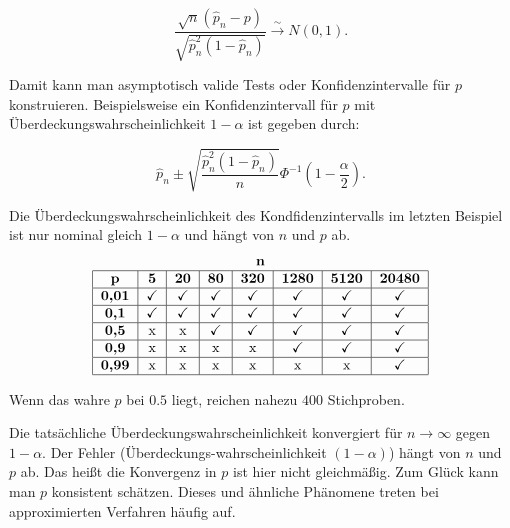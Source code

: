 \documentclass[10pt]{article}
\newcommand{\KV}{\overset{\sim} \longrightarrow} %
\newenvironment{BSP}[1][]
{\begin{Beispiel}[frametitle=#1]}{\end{Beispiel}}
\begin{document}
\begin{BSP}[Beispiel 1.3.6 (Delta-Methode)]
		\begin{equation*}
			\frac{\sqrt{n}(\hat{p}_n-p)}{\sqrt{\hat{p}_n^2(1-\hat{p}_n)}} \KV N(0,1).
		\end{equation*}
		
		Damit kann man asymptotisch valide Tests oder Konfidenzintervalle für $p$ konstruieren. Beispielsweise ein Konfidenzintervall für $p$ mit Überdeckungswahrscheinlichkeit $1-\alpha$ ist gegeben durch:
		
		\begin{equation*}
			\hat{p}_n \pm \sqrt{\frac{\hat{p}_n^2 (1-\hat{p}_n)}{n}} \Phi^{-1} \left(1-\frac{\alpha}{2}\right).
		\end{equation*}
		
	\end{BSP}
	
	\noindent Die Überdeckungswahrscheinlichkeit des Kondfidenzintervalls im letzten Beispiel ist nur nominal gleich $1-\alpha$ und hängt von $n$ und $p$ ab. 
	\begin{align*}
		\begin{tabular}{|c|c|c|c|c|c|c|c|}
			\multicolumn{8}{c}{$\textbf{n}$}\\
			\hline
			\textbf{p} & \textbf{5} & \textbf{20} & \textbf{80} & \textbf{320} & \textbf{1280} & \textbf{5120} & \textbf{20480}\\
			\hline
			\textbf{0,01} & \checkmark & \checkmark & \checkmark & \checkmark & \checkmark & \checkmark & \checkmark \\
			\hline
			\textbf{0,1} & \checkmark & \checkmark & \checkmark & \checkmark & \checkmark & \checkmark & \checkmark\\
			\hline
			\textbf{0,5} & x & x & \checkmark & \checkmark & \checkmark & \checkmark & \checkmark\\
			\hline
			\textbf{0,9} &x &x &x &x & \checkmark& \checkmark& \checkmark\\
			\hline
			\textbf{0,99} &x &x &x &x &x &x & \checkmark \\
			\hline
		\end{tabular}
	\end{align*}
	
	
	
	\noindent Wenn das wahre $p$ bei $0.5$ liegt, reichen nahezu $400$ Stichproben. 
	
	Die tatsächliche Überdeckungswahrscheinlichkeit konvergiert für  $n \rightarrow \infty$ gegen $1-\alpha$. Der Fehler (Überdeckungs-wahrscheinlichkeit $(1-\alpha)$) hängt von $n$ und $p$ ab. Das heißt die Konvergenz in $p$ ist hier nicht gleichmäßig. Zum Glück kann man $p$ konsistent schätzen. Dieses und ähnliche Phänomene treten bei approximierten Verfahren häufig auf. 
	
\end{document}
